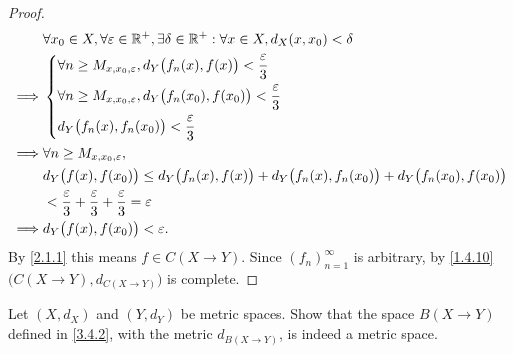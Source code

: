 \begin{proof}
  \begin{align*}
             & \forall x_0 \in X, \forall \varepsilon \in \mathbb{R}^+, \exists \delta \in \mathbb{R}^+ : \forall x \in X, d_X(x, x_0) < \delta         \\
    \implies & \begin{dcases}
                 \forall n \geq M_{x, x_0, \varepsilon}, d_Y\big(f_n(x), f(x)\big) < \dfrac{\varepsilon}{3}     \\
                 \forall n \geq M_{x, x_0, \varepsilon}, d_Y\big(f_n(x_0), f(x_0)\big) < \dfrac{\varepsilon}{3} \\
                 d_Y\big(f_n(x), f_n(x_0)\big) < \dfrac{\varepsilon}{3}
               \end{dcases}                           \\
    \implies & \forall n \geq M_{x, x_0, \varepsilon},                                                                                  \\
             & d_Y\big(f(x), f(x_0)\big) \leq d_Y\big(f_n(x), f(x)\big) + d_Y\big(f_n(x), f_n(x_0)\big) + d_Y\big(f_n(x_0), f(x_0)\big) \\
             & < \dfrac{\varepsilon}{3} + \dfrac{\varepsilon}{3} + \dfrac{\varepsilon}{3} = \varepsilon                                 \\
    \implies & d_Y\big(f(x), f(x_0)\big) < \varepsilon.
  \end{align*}
  By \cref{2.1.1} this means \(f \in C(X \to Y)\).
  Since \((f_n)_{n = 1}^\infty\) is arbitrary, by \cref{1.4.10} \(\big(C(X \to Y), d_{C(X \to Y)}\big)\) is complete.
\end{proof}

\exercisesection

\begin{ex}\label{ex:3.4.1}
  Let \((X, d_X)\) and \((Y, d_Y)\) be metric spaces.
  Show that the space \(B(X \to Y)\) defined in \cref{3.4.2}, with the metric \(d_{B(X \to Y)}\), is indeed a metric space.
\end{ex}

